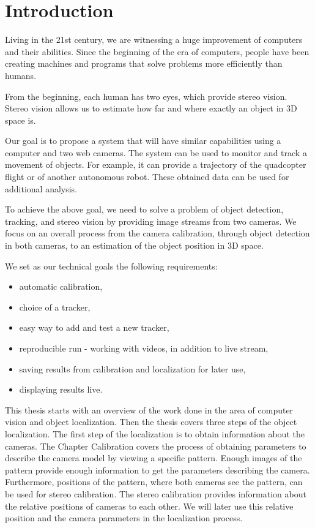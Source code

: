 \chapter*{Introduction}

Living in the 21st century, we are witnessing a huge improvement of
computers and their abilities. Since the beginning of the era of computers,
people have been creating machines and programs that solve problems more
efficiently than humans.

From the beginning, each human has two eyes, which provide stereo
vision. Stereo vision allows us to estimate how far and where exactly an object
in 3D space is.

Our goal is to propose a system that will have similar capabilities using a
computer and two web cameras. The system can be used to monitor and track a
movement of objects. For example, it can provide a trajectory of the quadcopter
flight or of another autonomous robot. These obtained data can be used for
additional analysis.

To achieve the above goal, we need to solve a problem of object detection,
tracking, and stereo vision by providing image streams from two cameras. We
focus on an overall process from the camera calibration, through object
detection in both cameras, to an estimation of the object position in 3D space.

We set as our technical goals the following requirements:
\begin{itemize}
\item automatic calibration,
\item choice of a tracker,
\item easy way to add and test a new tracker,
\item reproducible run - working with videos, in addition to live stream,
\item saving results from calibration and localization for later use,
\item displaying results live.
\end{itemize}

This thesis starts with an overview of the work done in the area of computer
vision and object localization. Then the thesis covers three steps of the
object localization. The first step of the localization is to obtain
information about the cameras. The Chapter Calibration covers the process of
obtaining parameters to describe the camera model by viewing a specific
pattern. Enough images of the pattern provide enough information to get the
parameters describing the camera. Furthermore, positions of the pattern, where
both cameras see the pattern, can be used for stereo calibration. The stereo
calibration provides information about the relative positions of cameras to
each other. We will later use this relative position and the camera parameters
in the localization process.

